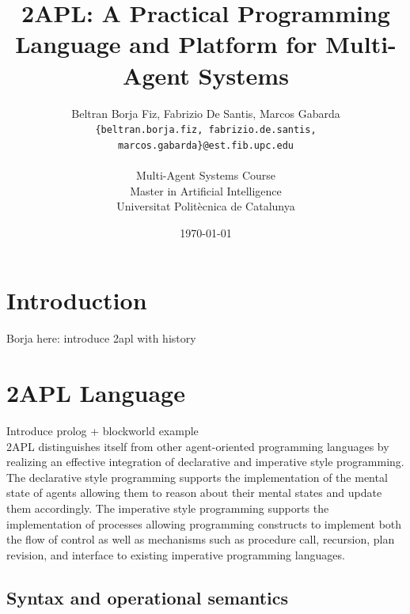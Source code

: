 \documentclass[a4paper]{article}
\begin{document}
\title{2APL: A Practical Programming Language and Platform for Multi-Agent Systems}
 
\author{Beltran Borja Fiz, Fabrizio De Santis, Marcos Gabarda\\
\small \texttt{\{beltran.borja.fiz, fabrizio.de.santis, marcos.gabarda\}@est.fib.upc.edu}\\
\\
Multi-Agent Systems Course\\
Master in Artificial Intelligence\\
Universitat Polit\`ecnica de Catalunya}
\date{\today}

\newenvironment{fminipage}%
  {\begin{Sbox}\begin{minipage}}%
  {\end{minipage}\end{Sbox}\fbox{\TheSbox}}


\maketitle

\tableofcontents

\section{Introduction} %

Borja here: introduce 2apl with history

\section{2APL Language} %

Introduce prolog + blockworld example
\\
2APL distinguishes itself from other agent-oriented programming
languages by realizing an effective integration of declarative and
imperative style programming.
The declarative style programming supports the implementation of
the mental state of agents allowing them to reason about their
mental states and update them accordingly.
The imperative style programming supports the implementation of
processes allowing programming constructs to implement both the
flow of control as well as mechanisms such as procedure call,
recursion, plan revision, and interface to existing imperative
programming languages.


\subsection{Syntax and operational semantics} %
\end{document}
